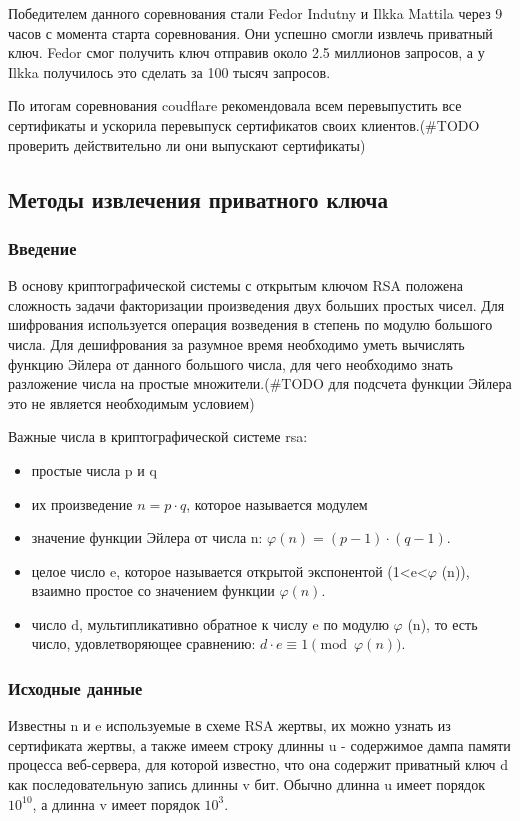 \documentclass[20pt]{article}
\begin{document}
Победителем данного соревнования стали Fedor Indutny\cite{heartbleed/Indutny} и
Ilkka Mattila через 9 часов с момента старта соревнования. Они успешно смогли
извлечь приватный ключ. Fedor смог получить ключ отправив около 2.5 миллионов
запросов, а у Ilkka получилось это сделать за 100 тысяч запросов.

По итогам соревнования coudflare рекомендовала всем перевыпустить все сертификаты
и ускорила перевыпуск сертификатов своих клиентов.(#TODO проверить действительно
ли они выпускают сертификаты)

\subsection{Методы извлечения приватного ключа \cite{playing-hide-and-seek-with-stored-keys} }

\subsubsection{Введение}
В основу криптографической системы с открытым ключом RSA положена сложность задачи
факторизации произведения двух больших простых чисел. Для шифрования используется
операция возведения в степень по модулю большого числа. Для дешифрования за
разумное время необходимо уметь вычислять функцию Эйлера от данного большого
числа, для чего необходимо знать разложение числа на простые множители.(#TODO
для подсчета функции Эйлера это не является необходимым условием)

Важные числа в криптографической системе rsa:
\begin{itemize}
  \item простые числа p и q
  \item их произведение $n=p \cdot q$, которое называется модулем
  \item значение функции Эйлера от числа n: $\varphi (n)=(p-1)\cdot (q-1)$.
  \item целое число e, которое называется открытой экспонентой
    (1<e<$\varphi$ (n)), взаимно простое со значением функции $\varphi(n)$.
  \item число d, мультипликативно обратное к числу e по модулю
    $\varphi$ (n), то есть число, удовлетворяющее сравнению: $d\cdot e\equiv 1{\pmod {\varphi (n)}}$.
\end{itemize}

\subsubsection{Исходные данные}
Известны n и e используемые в схеме RSA жертвы, их можно узнать из сертификата
жертвы, а также имеем строку длинны u - содержимое дампа памяти процесса
веб-сервера, для которой известно, что она содержит приватный ключ d как
последовательную запись длинны v бит. Обычно длинна u имеет порядок $10^10$,
а длинна v имеет порядок $10^3$.
\end{document}
